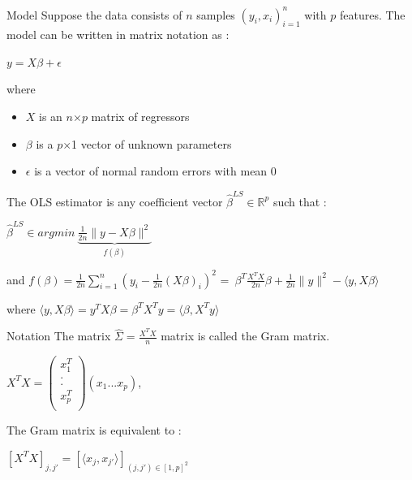 \documentclass[unknownkeysallowed]{beamer}
\begin{document}
\begin{frame}
\begin{alertblock}{Model}
Suppose the data consists of $n$ samples $( y_i, x_i )^n_{i=1}$ with $p$ features.
\newline The model can be written in matrix notation as :
\begin{center}
$y=X\beta+\epsilon$
\end{center}
where
 \begin{itemize}
        \item $X$ is an $n$$\times$$p$ matrix of regressors
        \item $\beta$  is a $p$$\times$1 vector of unknown parameters
        \item $\epsilon$ is a vector of normal random errors with mean 0
    \end{itemize}
\end{alertblock}
\vspace{0.4cm}
\end{frame}
\begin{frame}
The OLS estimator is any coefficient vector
$\hat\beta^{LS}\in\mathbb{R}^p$ such that :
\newline
\begin{center}
$\hat\beta^{LS} \in argmin \ \underbrace{\frac{1}{2n}\|y-X\beta\|^2 }_{f(\beta)}$
\end{center}
\vspace{0.5cm}
and $f(\beta)=\frac{1}{2n}\sum\limits_{i=1}^n (y_{i}-\frac{1}{2n}(X\beta)_{i})^2$ =\ $\beta^T\frac{X^TX}{2n}\beta+\frac{1}{2n}\|y\|^2- \langle y,X\beta\rangle$

\vspace{0.5cm}
where
$\langle y,X\beta\rangle=y^TX\beta=\beta^TX^Ty=\langle \beta,X^Ty\rangle$


\end{frame}
\begin{block}{Notation}
The matrix $\hat\Sigma=\frac{X^TX}{n}$ matrix is called the Gram matrix.
\begin{center}
    $X^TX=\begin{pmatrix}
   x_{1}^T  \\
   . \\
   . \\
   x_{p}^T  \\
\end{pmatrix}(x_{1}. . . x_{p}) $,
\end{center}

\end{block}
The Gram matrix is equivalent to :
\begin{center}
$[X^TX]_{j,j'}=[\langle x_{j},x_{j'}\rangle]_{(j,j')\in[1,p]^2}$
\end{center}
\end{document}
